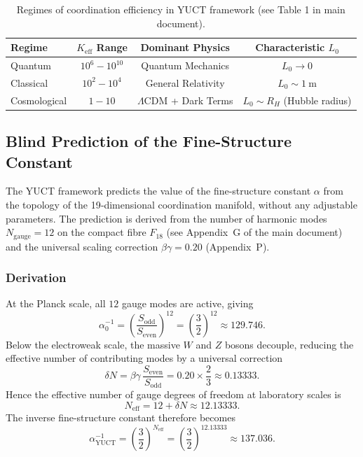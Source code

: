 \documentclass[12pt,a4paper]{article}
\theoremstyle{remark}
\newcommand{\Keff}{K_{\mathrm{eff}}}
\begin{document}
	\begin{table}[htbp]
		\centering
		\begin{tabular}{lccc}
			\toprule
			\textbf{Regime} & \textbf{$\Keff$ Range} & \textbf{Dominant Physics} & \textbf{Characteristic $L_0$} \\
			\midrule
			Quantum & $10^6 - 10^{10}$ & Quantum Mechanics & $L_0 \to 0$ \\
			Classical & $10^2 - 10^4$ & General Relativity & $L_0 \sim 1\ \text{m}$ \\
			Cosmological & $1 - 10$ & $\Lambda$CDM + Dark Terms & $L_0 \sim R_H$ (Hubble radius) \\
			\bottomrule
		\end{tabular}
		\caption{Regimes of coordination efficiency in YUCT framework (see Table 1 in main document).}
		\label{tab:keff-regimes}
	\end{table}
	
\subsection{Blind Prediction of the Fine-Structure Constant}
\label{subsec:blind_alpha}

The YUCT framework predicts the value of the fine-structure constant $\alpha$ from the topology of the 19‑dimensional coordination manifold, without any adjustable parameters. The prediction is derived from the number of harmonic modes $N_{\mathrm{gauge}} = 12$ on the compact fibre $F_{18}$ (see Appendix~G of the main document) and the universal scaling correction $\beta\gamma = 0.20$ (Appendix~P).

\subsubsection{Derivation}

At the Planck scale, all $12$ gauge modes are active, giving
\[
\alpha_0^{-1} = \left(\frac{S_{\mathrm{odd}}}{S_{\mathrm{even}}}\right)^{12}
= \left(\frac{3}{2}\right)^{12} \approx 129.746 .
\]
Below the electroweak scale, the massive $W$ and $Z$ bosons decouple, reducing the effective number of contributing modes by a universal correction
\[
\delta N = \beta\gamma \, \frac{S_{\mathrm{even}}}{S_{\mathrm{odd}}}
= 0.20 \times \frac{2}{3} \approx 0.13333 .
\]
Hence the effective number of gauge degrees of freedom at laboratory scales is
\[
N_{\mathrm{eff}} = 12 + \delta N \approx 12.13333 .
\]
The inverse fine-structure constant therefore becomes
\[
\boxed{\alpha^{-1}_{\mathrm{YUCT}} = \left(\frac{3}{2}\right)^{N_{\mathrm{eff}}}
	= \left(\frac{3}{2}\right)^{12.13333} \approx 137.036 } .
\]
\end{document}
